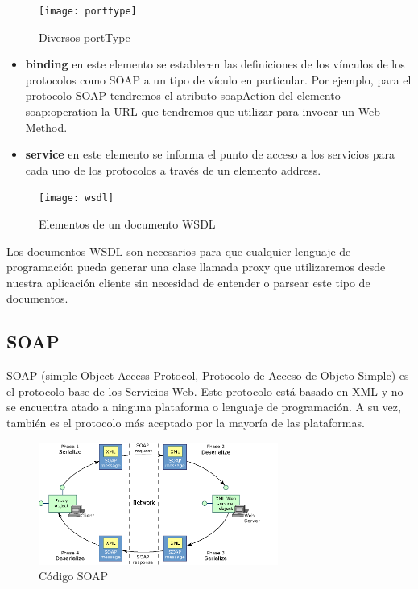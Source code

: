 \documentclass[12pt,letterpaper,titlepage]{article}
\begin{document}
\begin{figure}
  \centering
    \texttt{[image: porttype]}
  \caption{Diversos portType}
  \label{figx:porttype}
\end{figure}

\begin{itemize}\itemsep=0pt
\item \textbf{binding} en este elemento se establecen las definiciones de los vínculos de los protocolos como SOAP a un tipo de vículo en particular. Por ejemplo, para el protocolo SOAP tendremos el atributo soapAction del elemento soap:operation la URL que tendremos que utilizar para invocar un Web Method.\\
\item \textbf{service} en este elemento se informa el punto de acceso a los servicios para cada uno de los protocolos a través de un elemento address.\\
\end{itemize}

\begin{figure}
  \centering
    \texttt{[image: wsdl]}
  \caption{Elementos de un documento WSDL}
  \label{figx:wsdl}
\end{figure}

Los documentos WSDL son necesarios para que cualquier lenguaje de programación pueda generar una clase llamada proxy que utilizaremos desde nuestra aplicación cliente sin necesidad de entender o parsear este tipo de documentos.\\

\subsection{SOAP}\label{soap}
SOAP (simple Object Access Protocol, Protocolo de Acceso de Objeto Simple) es el protocolo base de los Servicios Web. Este protocolo está basado en XML y no se encuentra atado a ninguna plataforma o lenguaje de programación. A su vez, también es el protocolo más aceptado por la mayoría de las plataformas.

\begin{figure}
  \centering
    \includegraphics[width=0.7\textwidth]{soap}
  \caption{Código SOAP}
  \label{figx:soap}
\end{figure}
\end{document}
